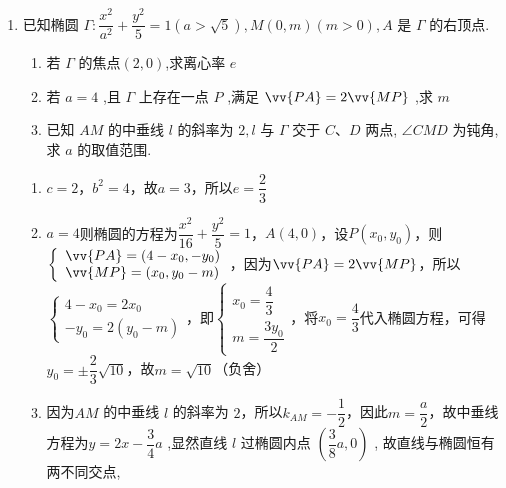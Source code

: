 \begin{enumerate}
\begin{jieda}
\begin{enumerate}
\begin{dingautolist}{172}
                根据韦达定理可得$k_1+k_2 = \dfrac{-(6n+12m)}{4+12n}$，代入$3m-\dfrac{3}{2}n = 1$可得$k_1+k_2 = -1$
            \end{dingautolist}
        \end{enumerate}
    \end{jieda}
    \item 已知椭圆 $\Gamma  : \dfrac{{x}^{2}}{{a}^{2}} + \dfrac{{y}^{2}}{5} = 1\left( {a > \sqrt{5}}\right) ,M\left( {0,m}\right) \left( {m > 0}\right) ,A$ 是 $\Gamma$ 的右顶点.
    \begin{enumerate}
        \item 若 $\Gamma$ 的焦点$(2,0)$,求离心率 $e$
        \item 若 $a = 4$ ,且 $\Gamma$ 上存在一点 $P$ ,满足 $\vv{PA} = 2\vv{MP}$ ,求 $m$
        \item 已知 ${AM}$ 的中垂线 $l$ 的斜率为 $2,l$ 与 $\Gamma$ 交于 $C\text{、}D$ 两点, $\angle {CMD}$ 为钝角,求 $a$ 的取值范围.
    \end{enumerate}
    \begin{jieda}
        \begin{enumerate}
            \item $c = 2$，$b^2 = 4$，故$a = 3$，所以$e = \dfrac{2}{3}$
            \item $a = 4$则椭圆的方程为$\dfrac{x^2}{16} + \dfrac{y^2}{5} = 1$，$A(4, 0)$，设$P(x_0, y_0)$，则$\left\{\begin{array}{l}
                 \vv{PA} = (4-x_0, -y_0)  \\
                 \vv{MP} = (x_0, y_0-m)
            \end{array}\right.$，因为$\vv{PA} = 2\vv{MP}$，所以$\left\{\begin{array}{l}
                 4-x_0 = 2x_0  \\
                 -y_0 = 2(y_0-m)
            \end{array}\right.$，即$\left\{\begin{array}{l}
                 x_0 = \dfrac{4}{3}  \\
                 m = \dfrac{3y_0}{2}
            \end{array}\right.$，将$x_0 = \dfrac{4}{3}$代入椭圆方程，可得$y_0 = \pm \dfrac{2}{3}\sqrt{10}$，故$m = \sqrt{10}$（负舍）
            \item 因为${AM}$ 的中垂线 $l$ 的斜率为 $2$，所以$k_{AM} = -\dfrac{1}{2}$，因此$m = \dfrac{a}{2}$，故中垂线方程为$y = {2x} - \dfrac{3}{4}a$ ,显然直线 $l$ 过椭圆内点 $\left( {\dfrac{3}{8}a,0}\right)$ ,
                故直线与椭圆恒有两不同交点,

\end{enumerate}
\end{jieda}
\end{enumerate}
